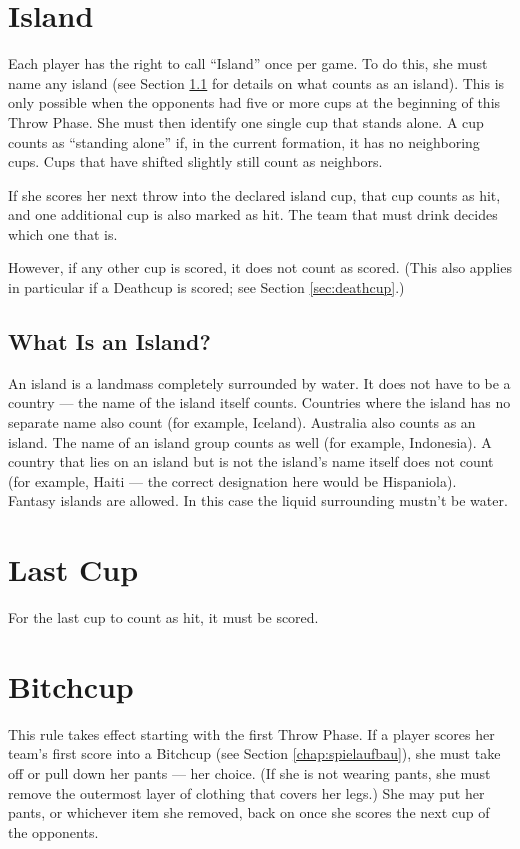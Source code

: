 \documentclass[a5paper, 12pt]{book}
\begin{document}
\section{Island}\label{sec:island}
Each player has the right to call “Island” once per game.  
To do this, she must name any island (see Section \ref{sec:whatisanisland} for details on what counts as an island).  
This is only possible when the opponents had five or more cups at the beginning of this Throw Phase.  
She must then identify one single cup that stands alone.  
A cup counts as “standing alone” if, in the current formation, it has no neighboring cups.  
Cups that have shifted slightly still count as neighbors.  

If she scores her next throw into the declared island cup, that cup counts as hit, and one additional cup is also marked as hit.  
The team that must drink decides which one that is.  

However, if any other cup is scored, it does not count as scored.  
(This also applies in particular if a Deathcup is scored; see Section \ref{sec:deathcup}.)

\subsection{What Is an Island?}\label{sec:whatisanisland}
An island is a landmass completely surrounded by water.  
It does not have to be a country — the name of the island itself counts.  
Countries where the island has no separate name also count (for example, Iceland).  
Australia also counts as an island.  
The name of an island group counts as well (for example, Indonesia).  
A country that lies on an island but is not the island’s name itself does not count (for example, Haiti — the correct designation here would be Hispaniola).\\
Fantasy islands are allowed. In this case the liquid surrounding mustn't be water.

\section{Last Cup}\label{sec:letzter}
For the last cup to count as hit, it must be scored.

\section{Bitchcup}\label{sec:bitchcup}
This rule takes effect starting with the first Throw Phase.  
If a player scores her team’s first score into a Bitchcup (see Section \ref{chap:spielaufbau}), she must take off or pull down her pants — her choice.  
(If she is not wearing pants, she must remove the outermost layer of clothing that covers her legs.)  
She may put her pants, or whichever item she removed, back on once she scores the next cup of the opponents.  
\end{document}
